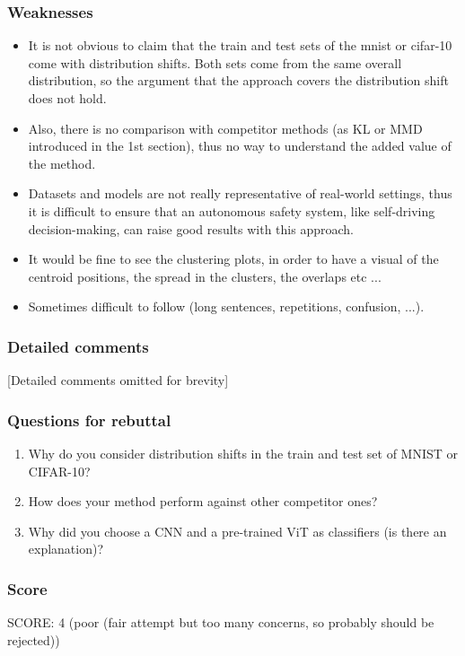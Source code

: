 \subsubsection*{Weaknesses}
\begin{itemize}
    \item It is not obvious to claim that the train and test sets of the mnist or cifar-10 come with distribution shifts. Both sets come from the same overall distribution, so the argument that the approach covers the distribution shift does not hold.
    \item Also, there is no comparison with competitor methods (as KL or MMD introduced in the 1st section), thus no way to understand the added value of the method.
    \item Datasets and models are not really representative of real-world settings, thus it is difficult to ensure that an autonomous safety system, like self-driving decision-making, can raise good results with this approach.
    \item It would be fine to see the clustering plots, in order to have a visual of the centroid positions, the spread in the clusters, the overlaps etc ...
    \item Sometimes difficult to follow (long sentences, repetitions, confusion, ...).
\end{itemize}

\subsubsection*{Detailed comments}
[Detailed comments omitted for brevity]

\subsubsection*{Questions for rebuttal}
\begin{enumerate}
    \item Why do you consider distribution shifts in the train and test set of MNIST or CIFAR-10?
    \item How does your method perform against other competitor ones?
    \item Why did you choose a CNN and a pre-trained ViT as classifiers (is there an explanation)?
\end{enumerate}

\subsubsection*{Score}
SCORE: 4 (poor (fair attempt but too many concerns, so probably should be rejected))

